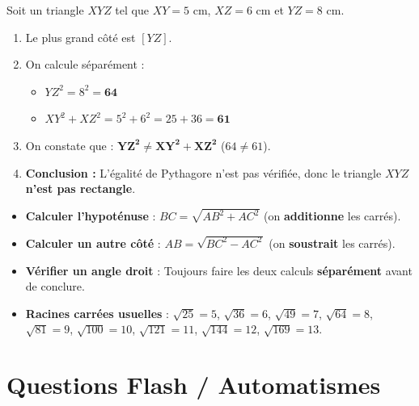 \begin{cadremethode}
Soit un triangle $XYZ$ tel que $XY = 5\text{ cm}$, $XZ = 6\text{ cm}$ et $YZ = 8\text{ cm}$.
\begin{enumerate}
    \item Le plus grand côté est $[YZ]$.
    \item On calcule séparément :
    \begin{itemize}
        \item $YZ^2 = 8^2 = \mathbf{64}$
        \item $XY^2 + XZ^2 = 5^2 + 6^2 = 25 + 36 = \mathbf{61}$
    \end{itemize}
    \item On constate que : $\mathbf{YZ^2 \neq XY^2 + XZ^2}$ ($64 \neq 61$).
    \item \textbf{Conclusion :} L'égalité de Pythagore n'est pas vérifiée, donc le triangle $XYZ$ \textbf{n'est pas rectangle}.
\end{enumerate}
\end{cadremethode}

\begin{cadreretenu}
\begin{itemize}
    \item \textbf{Calculer l'hypoténuse} : $BC = \sqrt{AB^2 + AC^2}$ (on \textbf{additionne} les carrés).
    \item \textbf{Calculer un autre côté} : $AB = \sqrt{BC^2 - AC^2}$ (on \textbf{soustrait} les carrés).
    \item \textbf{Vérifier un angle droit} : Toujours faire les deux calculs \textbf{séparément} avant de conclure.
    \item \textbf{Racines carrées usuelles} : $\sqrt{25}=5$, $\sqrt{36}=6$, $\sqrt{49}=7$, $\sqrt{64}=8$, $\sqrt{81}=9$, $\sqrt{100}=10$, $\sqrt{121}=11$, $\sqrt{144}=12$, $\sqrt{169}=13$.
\end{itemize}
\end{cadreretenu}

\section{Questions Flash / Automatismes}

